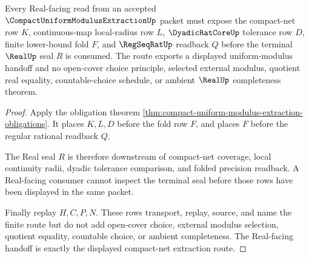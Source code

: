 \begin{theorem}
\label{thm:compact-uniform-modulus-extraction-real-seal-route}
Every Real-facing read from an accepted $\CompactUniformModulusExtractionUp$ packet must expose the compact-net row $K$, continuous-map local-radius row $L$, $\DyadicRatCoreUp$ tolerance row $D$, finite lower-bound fold $F$, and $\RegSeqRatUp$ readback $Q$ before the terminal $\RealUp$ seal $R$ is consumed. The route exports a displayed uniform-modulus handoff and no open-cover choice principle, selected external modulus, quotient real equality, countable-choice schedule, or ambient $\RealUp$ completeness theorem.
\end{theorem}
\begin{proof}
Apply the obligation theorem \autoref{thm:compact-uniform-modulus-extraction-obligations}. It places $K,L,D$ before the fold row $F$, and places $F$ before the regular rational readback $Q$.

The Real seal $R$ is therefore downstream of compact-net coverage, local continuity radii, dyadic tolerance comparison, and folded precision readback. A Real-facing consumer cannot inspect the terminal seal before those rows have been displayed in the same packet.

Finally replay $H,C,P,N$. These rows transport, replay, source, and name the finite route but do not add open-cover choice, external modulus selection, quotient equality, countable choice, or ambient completeness. The Real-facing handoff is exactly the displayed compact-net extraction route.
\end{proof}




